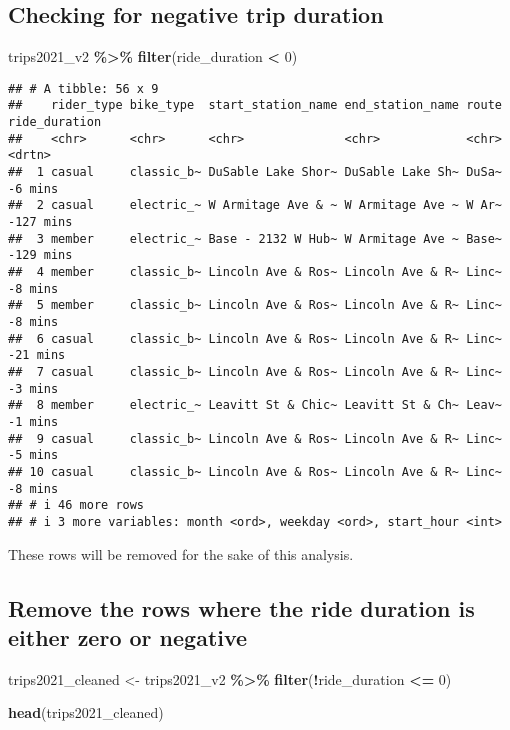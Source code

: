 \documentclass[
]{article}
\newenvironment{Shaded}{\begin{snugshade}}{\end{snugshade}}
\newcommand{\DecValTok}[1]{\textcolor[rgb]{0.00,0.00,0.81}{#1}}
\newcommand{\FunctionTok}[1]{\textcolor[rgb]{0.13,0.29,0.53}{\textbf{#1}}}
\newcommand{\NormalTok}[1]{#1}
\newcommand{\OtherTok}[1]{\textcolor[rgb]{0.56,0.35,0.01}{#1}}
\newcommand{\SpecialCharTok}[1]{\textcolor[rgb]{0.81,0.36,0.00}{\textbf{#1}}}
\begin{document}
\hypertarget{checking-for-negative-trip-duration}{%
\subsection{Checking for negative trip
duration}\label{checking-for-negative-trip-duration}}

\begin{Shaded}
\begin{Highlighting}[]
\NormalTok{trips2021\_v2 }\SpecialCharTok{\%\textgreater{}\%} 
  \FunctionTok{filter}\NormalTok{(ride\_duration }\SpecialCharTok{\textless{}} \DecValTok{0}\NormalTok{)}
\end{Highlighting}
\end{Shaded}

\begin{verbatim}
## # A tibble: 56 x 9
##    rider_type bike_type  start_station_name end_station_name route ride_duration
##    <chr>      <chr>      <chr>              <chr>            <chr> <drtn>       
##  1 casual     classic_b~ DuSable Lake Shor~ DuSable Lake Sh~ DuSa~   -6 mins    
##  2 casual     electric_~ W Armitage Ave & ~ W Armitage Ave ~ W Ar~ -127 mins    
##  3 member     electric_~ Base - 2132 W Hub~ W Armitage Ave ~ Base~ -129 mins    
##  4 member     classic_b~ Lincoln Ave & Ros~ Lincoln Ave & R~ Linc~   -8 mins    
##  5 member     classic_b~ Lincoln Ave & Ros~ Lincoln Ave & R~ Linc~   -8 mins    
##  6 casual     classic_b~ Lincoln Ave & Ros~ Lincoln Ave & R~ Linc~  -21 mins    
##  7 casual     classic_b~ Lincoln Ave & Ros~ Lincoln Ave & R~ Linc~   -3 mins    
##  8 member     electric_~ Leavitt St & Chic~ Leavitt St & Ch~ Leav~   -1 mins    
##  9 casual     classic_b~ Lincoln Ave & Ros~ Lincoln Ave & R~ Linc~   -5 mins    
## 10 casual     classic_b~ Lincoln Ave & Ros~ Lincoln Ave & R~ Linc~   -8 mins    
## # i 46 more rows
## # i 3 more variables: month <ord>, weekday <ord>, start_hour <int>
\end{verbatim}

These rows will be removed for the sake of this analysis.

\hypertarget{remove-the-rows-where-the-ride-duration-is-either-zero-or-negative}{%
\subsection{Remove the rows where the ride duration is either zero or
negative}\label{remove-the-rows-where-the-ride-duration-is-either-zero-or-negative}}

\begin{Shaded}
\begin{Highlighting}[]
\NormalTok{trips2021\_cleaned }\OtherTok{\textless{}{-}}\NormalTok{ trips2021\_v2 }\SpecialCharTok{\%\textgreater{}\%} 
  \FunctionTok{filter}\NormalTok{(}\SpecialCharTok{!}\NormalTok{ride\_duration }\SpecialCharTok{\textless{}=} \DecValTok{0}\NormalTok{)}

\FunctionTok{head}\NormalTok{(trips2021\_cleaned)}
\end{Highlighting}
\end{Shaded}
\end{document}
